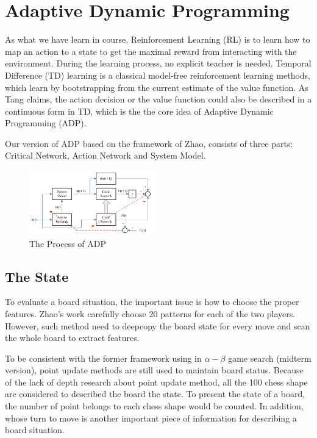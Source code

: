 \documentclass[sigconf, nonacm]{acmart}
\begin{document}
\section{Adaptive Dynamic Programming}
%
\quad As what we have learn in course, Reinforcement Learning (RL)  is to learn how to map an action to a state to get the maximal reward from interacting with the environment. 
%
During the learning process, no explicit teacher is needed.
%
Temporal Difference (TD) learning is a classical model-free reinforcement learning methods, which learn by bootstrapping from the current estimate of the value function. 
%
As Tang\cite{Tang/ztt} claims, the action 
decision or the value function could also be described in a 
continuous form in TD, which is the the core idea of Adaptive Dynamic 
Programming (ADP).

%
Our version of ADP based on the framework of Zhao\cite{Zhao/ztt}, consists of three parts: Critical Network, Action Network and System Model.

\begin{figure}[h]
  \centering
  \includegraphics[width=0.5\textwidth]{figures/ADP.png}
  \caption{The Process of ADP}
  \label{fig:adp}
\end{figure}


\subsection{The State}
%
\quad To evaluate a board situation, the important issue is how to
choose the proper features.
%
Zhao's work carefully choose 20 patterns for each of the two players.
%
However, such method need to deepcopy the board state for every move and scan the whole board to extract features.
%

%
To be consistent with the former framework using in $\alpha-\beta$ game search (midterm version), point update methods are still used to maintain board status.
%
Because of the lack of depth research about point update method, all the 100 chess shape are considered to described the board the state.
%
To present the state of a board, the number of point belongs to each chess shape would be counted.
%
In addition, whose turn to move is another important piece of
information for describing a board situation.
\end{document}

